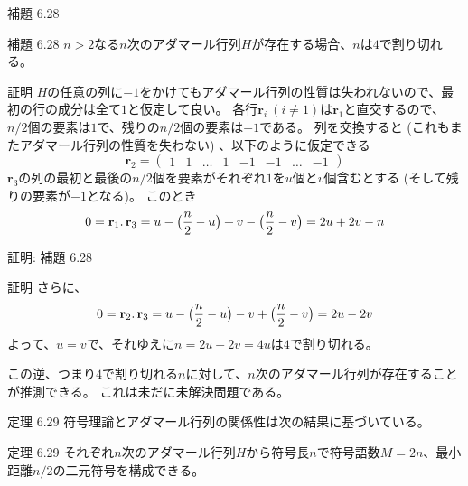 \documentclass[dvipdfmx,10pt,jsarticle]{beamer}
\begin{document}
  \begin{frame}{補題 6.28}
    \begin{block}{補題 6.28}
      $n > 2$なる$n$次のアダマール行列$H$が存在する場合、$n$は$4$で割り切れる。
    \end{block}

      \begin{block}{証明}
        $H$の任意の列に$-1$をかけてもアダマール行列の性質は失われないので、最初の行の成分は全て$1$と仮定して良い。
        各行$\mathbf{r}_i \ (i \neq 1)$は$\mathbf{r}_1$と直交するので、$n/2$個の要素は$1$で、残りの$n/2$個の要素は$-1$である。
        列を交換すると (これもまたアダマール行列の性質を失わない) 、以下のように仮定できる
        \[ \mathbf{r}_2 = \begin{pmatrix} 1 & 1 & \ldots & 1 & -1 & -1 & \ldots & -1 \end{pmatrix} \]
        $\mathbf{r}_3$の列の最初と最後の$n/2$個を要素がそれぞれ$1$を$u$個と$v$個含むとする (そして残りの要素が$-1$となる)。 このとき
        \[0 = \mathbf{r}_1 \ldotp \mathbf{r}_3 = u - \big( \frac n2 - u \big) + v - \big( \frac n2 - v \big) = 2u + 2v - n\]
      \end{block}
  \end{frame}
  \begin{frame}{証明: 補題 6.28}
      \begin{block}{証明}
        さらに、
        \[ 0 = \mathbf{r}_2 \ldotp \mathbf{r}_3 = u - \big( \frac n2 - u \big) - v + \big( \frac n2 - v \big) = 2u - 2v \]
        よって、$u = v$で、それゆえに$n = 2u + 2v = 4u$は$4$で割り切れる。
      \end{block}
        
      \vspace{1cm}
      この逆、つまり$4$で割り切れる$n$に対して、$n$次のアダマール行列が存在することが推測できる。
      これは未だに未解決問題である。

  \end{frame}

  \begin{frame}{定理 6.29}
    符号理論とアダマール行列の関係性は次の結果に基づいている。
    \begin{block}{定理 6.29}
      それぞれ$n$次のアダマール行列$H$から符号長$n$で符号語数$M = 2n$、最小距離$n/2$の二元符号を構成できる。
    \end{block}

  \end{frame}
\end{document}
